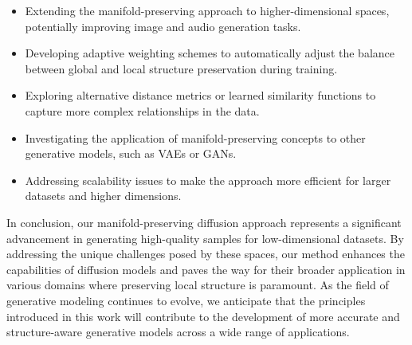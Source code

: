 \documentclass{article} %
\begin{document}
\begin{itemize}
    \item Extending the manifold-preserving approach to higher-dimensional spaces, potentially improving image and audio generation tasks.
    \item Developing adaptive weighting schemes to automatically adjust the balance between global and local structure preservation during training.
    \item Exploring alternative distance metrics or learned similarity functions to capture more complex relationships in the data.
    \item Investigating the application of manifold-preserving concepts to other generative models, such as VAEs or GANs.
    \item Addressing scalability issues to make the approach more efficient for larger datasets and higher dimensions.
\end{itemize}

In conclusion, our manifold-preserving diffusion approach represents a significant advancement in generating high-quality samples for low-dimensional datasets. By addressing the unique challenges posed by these spaces, our method enhances the capabilities of diffusion models and paves the way for their broader application in various domains where preserving local structure is paramount. As the field of generative modeling continues to evolve, we anticipate that the principles introduced in this work will contribute to the development of more accurate and structure-aware generative models across a wide range of applications.



\end{document}
